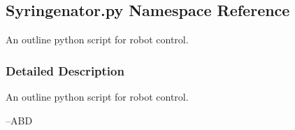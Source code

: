 \hypertarget{namespaceSyringenator_1_1py}{}\subsection{Syringenator.\+py Namespace Reference}
\label{namespaceSyringenator_1_1py}


An outline python script for robot control.  




\subsubsection{Detailed Description}
An outline python script for robot control. 

--A\+BD 